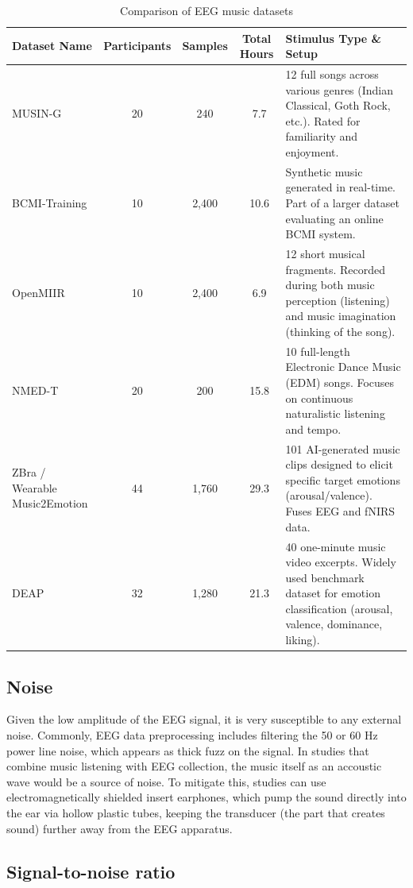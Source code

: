 \begin{table}[h]
\centering
\small
\begin{tabular}{|l|c|c|c|p{5cm}|}
\hline
Dataset Name & Participants & Samples & Total Hours & Stimulus Type \& Setup \\
\hline
MUSIN-G & 20 & 240 & ~7.7 & 12 full songs across various genres (Indian Classical, Goth Rock, etc.). Rated for familiarity and enjoyment. \\
\hline
BCMI-Training & 10 & 2,400 & ~10.6 & Synthetic music generated in real-time. Part of a larger dataset evaluating an online BCMI system. \\
\hline
OpenMIIR & 10 & 2,400 & ~6.9 & 12 short musical fragments. Recorded during both music perception (listening) and music imagination (thinking of the song). \\
\hline
NMED-T & 20 & 200 & ~15.8 & 10 full-length Electronic Dance Music (EDM) songs. Focuses on continuous naturalistic listening and tempo. \\
\hline
ZBra / Wearable Music2Emotion & 44 & 1,760 & ~29.3 & 101 AI-generated music clips designed to elicit specific target emotions (arousal/valence). Fuses EEG and fNIRS data. \\
\hline
DEAP & 32 & 1,280 & ~21.3 & 40 one-minute music video excerpts. Widely used benchmark dataset for emotion classification (arousal, valence, dominance, liking). \\
\hline
\end{tabular}
\caption{Comparison of EEG music datasets}
\label{tab:eeg-datasets}
\end{table}

\subsection{Noise}

Given the low amplitude of the EEG signal, it is very susceptible to any external noise.
Commonly, EEG data preprocessing includes filtering the 50 or 60 Hz power line noise, which appears as thick fuzz on the signal.
In studies that combine music listening with EEG collection, the music itself as an accoustic wave would be a source of noise.
To mitigate this, studies can use electromagnetically shielded insert earphones\cite{nozaradan}, which pump the sound directly into the ear via hollow plastic tubes, keeping the transducer (the part that creates sound) further away from the EEG apparatus.

\subsection{Signal-to-noise ratio}

